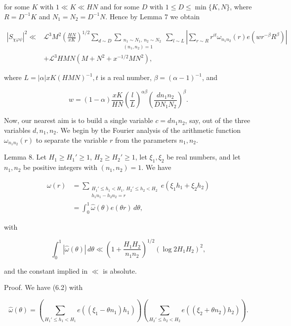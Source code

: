\documentclass[10pt]{article}
\begin{document}
for some $K$ with $1 \ll K \ll H N$ and for some $D$ with $1 \leqslant D \leqslant \min \{K, N\}$, where $R=D^{-1} K$ and $N_{1}=N_{2}=D^{-1} N$. Hence by Lemma 7 we obtain


\begin{align*}
\left|S_{\chi\varphi\psi}\right|^{2}\ll & \mathscr{L}^{3} M^{2}\left(\frac{H N}{x K}\right)^{1 / 2} \sum_{d\sim D}\sum_{\substack{n_1\sim N_1,\ n_2\sim N_2\\(n_1,n_2)=1}}\sum_{l\sim L}\left|\sum_{r \sim R} r^{i t} \omega_{n_{1} n_{2}}(r) e\left(w r^{-\beta} R^{\beta}\right)\right| \\
& +\mathscr{L}^{3} H M N\left(M+N^{2}+x^{-1 / 2} M N^{2}\right), \tag{6.1}
\end{align*}


where $L=|\alpha| x K(H M N)^{-1}, t$ is a real number, $\beta=(\alpha-1)^{-1}$, and

$$
w=(1-\alpha) \frac{x K}{H N}\left(\frac{l}{L}\right)^{\alpha \beta}\left(\frac{d n_{1} n_{2}}{D N_{1} N_{2}}\right)^{\beta} .
$$

Now, our nearest aim is to build a single variable $c=d n_{1} n_{2}$, say, out of the three variables $d, n_{1}, n_{2}$. We begin by the Fourier analysis of the arithmetic function $\omega_{n_{1} n_{2}}(r)$ to separate the variable $r$ from the parameters $n_{1}, n_{2}$.

Lemma 8. Let $H_1\geqslant H_1'\geqslant1$,
$H_2\geqslant H_2'\geqslant1$, let $\xi_1,\xi_2$ be real numbers, and let
$n_1,n_2$ be positive integers with $(n_1,n_2)=1$. We have

\begin{align*}
\omega(r)
&=\sum_{\substack{H_1'\leqslant h_1<H_1,\ H_2'\leqslant h_2<H_2\\
h_1n_1-h_2n_2=r}}e(\xi_1h_1+\xi_2h_2)\\
&=\int_0^1\widehat\omega(\theta)e(\theta r)\,d\theta, \tag{6.2}
\end{align*}

with

\begin{equation*}
\int_0^1|\widehat\omega(\theta)|\,d\theta
\ll\left(1+\frac{H_1H_2}{n_1n_2}\right)^{1/2}
\left(\log 2H_1H_2\right)^2, \tag{6.3}
\end{equation*}

and the constant implied in $\ll$ is absolute.

Proof. We have (6.2) with

$$
\widehat\omega(\theta)=
\left(\sum_{H_1'\leqslant h_1<H_1}e\left((\xi_1-\theta n_1)h_1\right)\right)
\left(\sum_{H_2'\leqslant h_2<H_2}e\left((\xi_2+\theta n_2)h_2\right)\right).
$$
\end{document}
